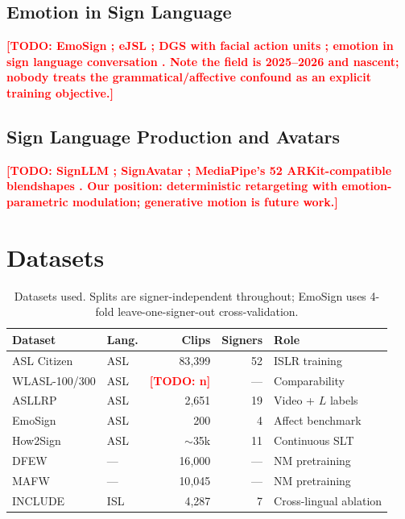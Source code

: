 \documentclass[conference]{IEEEtran}
\newcommand{\TODO}[1]{\textcolor{red}{\textbf{[TODO: #1]}}}
\begin{document}
\subsection{Emotion in Sign Language}
\TODO{EmoSign \cite{chua2025emosign}; eJSL \cite{ejsl2026}; DGS with facial action units
\cite{dgs_aus2026}; emotion in sign language conversation \cite{slconversation2026}. Note the field
is 2025--2026 and nascent; nobody treats the grammatical/affective confound as an explicit training
objective.}

\subsection{Sign Language Production and Avatars}
\TODO{SignLLM \cite{fang2024signllm}; SignAvatar \cite{signavatar2024}; MediaPipe's 52
ARKit-compatible blendshapes \cite{lugaresi2019mediapipe}. Our position: deterministic retargeting
with emotion-parametric modulation; generative motion is future work.}

\section{Datasets}
\label{sec:datasets}

\begin{table}[t]
\caption{Datasets used. Splits are signer-independent throughout;
EmoSign uses 4-fold leave-one-signer-out cross-validation.}
\label{tab:datasets}
\centering
\small
\begin{tabular}{@{}llrrl@{}}
\toprule
Dataset & Lang. & Clips & Signers & Role \\
\midrule
ASL Citizen \cite{desai2023aslcitizen} & ASL & 83{,}399 & 52 & ISLR training \\
WLASL-100/300 \cite{li2020wlasl}       & ASL & \TODO{n} & --- & Comparability \\
ASLLRP \cite{neidle2022asllrp}         & ASL & 2{,}651  & 19 & Video + $L$ labels \\
EmoSign \cite{chua2025emosign}         & ASL & 200      & 4  & Affect benchmark \\
How2Sign \cite{duarte2021how2sign}     & ASL & $\sim$35k & 11 & Continuous SLT \\
DFEW \cite{jiang2020dfew}              & --- & 16{,}000 & --- & NM pretraining \\
MAFW \cite{liu2022mafw}                & --- & 10{,}045 & --- & NM pretraining \\
INCLUDE \cite{sridhar2020include}      & ISL & 4{,}287  & 7  & Cross-lingual ablation \\
\bottomrule
\end{tabular}
\end{table}
\end{document}
